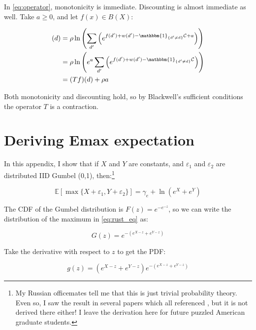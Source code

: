 In \eqref{eq:operator}, monotonicity is immediate.  Discounting is almost
immediate as well. Take $a \geq 0$, and let $f(x) \in B(X)$:

\begin{align}
    [T(f + a)](d) &= \rho \ln \left( \sum_{d'} \left(e^{f(d') + w(d') - \mathbbm{1}_{\{d'\neq d\}}\mathcal{C} + a}\right)\right) \nonumber \\
    &= \rho \ln \left( e^a \sum_{d'} \left(e^{f(d') + w(d') - \mathbbm{1}_{\{d'\neq d\}}\mathcal{C}}\right)\right) \nonumber \\
    &= (Tf)(d) + \rho a \nonumber \\
\end{align}

Both monotonicity and discounting hold, so by Blackwell's sufficient conditions the operator $T$ is a contraction.

\clearpage
\section{Deriving Emax expectation}
\label{sec:exp_der}

In this appendix, I show that if $X$ and $Y$ are constants, and $\varepsilon_1$ and $\varepsilon_2$ are distributed IID Gumbel (0,1), then:\footnote{My Russian officemates tell me that this is just trivial probability theory.  Even so, I saw the result in several papers which all referenced \citet{rust1987optimal}, but it is not derived there either!  I leave the derivation here for future puzzled American graduate students.}

\begin{equation}
    \mathbb{E} \left[\max\{X + \varepsilon_1, Y + \varepsilon_2\}\right] = \gamma_e + \ln \left(e^{X} + e^{Y}\right)
    \label{eq:rust_eq}
\end{equation}

The CDF of the Gumbel distribution is $F(z) = e^{-e^{-z}}$, so we can write the distribution of the maximum in \eqref{eq:rust_eq} as:

\begin{equation}
    G(z) = e^{-\left(e^{X - z} + e^{Y - z}\right)}
\end{equation}

Take the derivative with respect to $z$ to get the PDF:

\begin{equation}
    g(z) = \left(e^{X - z} + e^{Y - z}\right) e^{-\left(e^{X - z} + e^{Y - z}\right)}
\end{equation}

